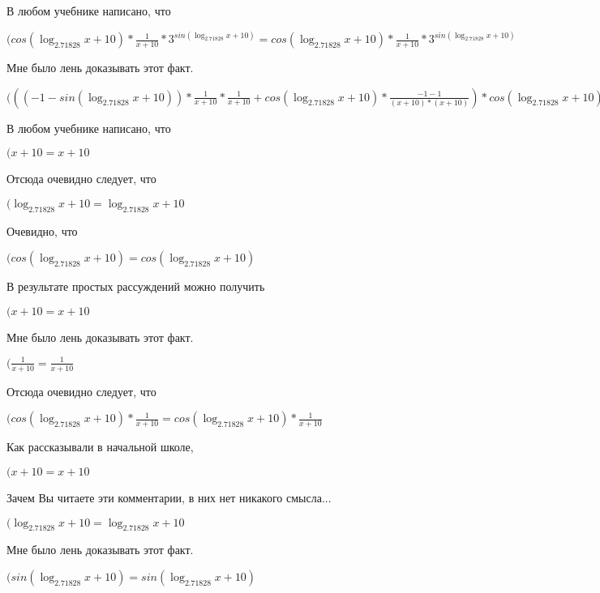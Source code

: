 \documentclass[12pt,a4paper,fleqn]{article}
\theoremstyle{definition}
\begin{document}
В любом учебнике написано, что

$(cos(\log_{ 2.71828 }{ x  +  10 }) * \frac{ 1 }{ x  +  10 }
 * { 3 }^{sin(\log_{ 2.71828 }{ x  +  10 })} = cos(\log_{ 2.71828 }{ x  +  10 }) * \frac{ 1 }{ x  +  10 }
 * { 3 }^{sin(\log_{ 2.71828 }{ x  +  10 })}$

Мне было лень доказывать этот факт.

$((( -1  - sin(\log_{ 2.71828 }{ x  +  10 })) * \frac{ 1 }{ x  +  10 }
 * \frac{ 1 }{ x  +  10 }
 + cos(\log_{ 2.71828 }{ x  +  10 }) * \frac{ -1  -  1 }{( x  +  10 ) * ( x  +  10 )}
) * cos(\log_{ 2.71828 }{ x  +  10 }) * \frac{ 1 }{ x  +  10 }
 * { 3 }^{sin(\log_{ 2.71828 }{ x  +  10 })} = (( -1  - sin(\log_{ 2.71828 }{ x  +  10 })) * \frac{ 1 }{ x  +  10 }
 * \frac{ 1 }{ x  +  10 }
 + cos(\log_{ 2.71828 }{ x  +  10 }) * \frac{ -1  -  1 }{( x  +  10 ) * ( x  +  10 )}
) * cos(\log_{ 2.71828 }{ x  +  10 }) * \frac{ 1 }{ x  +  10 }
 * { 3 }^{sin(\log_{ 2.71828 }{ x  +  10 })}$

В любом учебнике написано, что

$( x  +  10  =  x  +  10 $

Отсюда очевидно следует, что

$(\log_{ 2.71828 }{ x  +  10 } = \log_{ 2.71828 }{ x  +  10 }$

Очевидно, что

$(cos(\log_{ 2.71828 }{ x  +  10 }) = cos(\log_{ 2.71828 }{ x  +  10 })$

В результате простых рассуждений можно получить

$( x  +  10  =  x  +  10 $

Мне было лень доказывать этот факт.

$(\frac{ 1 }{ x  +  10 }
 = \frac{ 1 }{ x  +  10 }
$

Отсюда очевидно следует, что

$(cos(\log_{ 2.71828 }{ x  +  10 }) * \frac{ 1 }{ x  +  10 }
 = cos(\log_{ 2.71828 }{ x  +  10 }) * \frac{ 1 }{ x  +  10 }
$

Как рассказывали в начальной школе,

$( x  +  10  =  x  +  10 $

Зачем Вы читаете эти комментарии, в них нет никакого смысла...

$(\log_{ 2.71828 }{ x  +  10 } = \log_{ 2.71828 }{ x  +  10 }$

Мне было лень доказывать этот факт.

$(sin(\log_{ 2.71828 }{ x  +  10 }) = sin(\log_{ 2.71828 }{ x  +  10 })$
\end{document}
